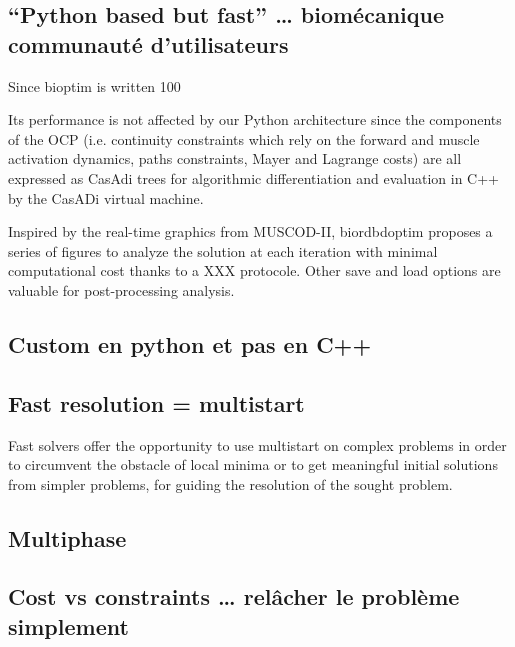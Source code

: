  

\subsection{“Python based but fast” … biomécanique communauté d’utilisateurs}

Since bioptim is written 100%

Its performance is not affected by our Python architecture since the components of the OCP (i.e. continuity constraints which rely on the forward and muscle activation dynamics, paths constraints, Mayer and Lagrange costs) are all expressed as CasAdi trees for algorithmic differentiation and evaluation in C++ by the CasADi virtual machine.  

Inspired by the  real-time graphics from MUSCOD-II, biordbdoptim proposes a series of figures to analyze the solution at each iteration with  minimal computational cost thanks to a XXX protocole. 
Other save and load options are valuable for post-processing analysis.

\subsection{Custom en python et pas en C++}

\subsection{Fast resolution = multistart}
Fast solvers offer the opportunity to use multistart on complex problems in order to circumvent the obstacle of local minima \cite{huchez2015local, bailly2020optimal} or to get meaningful initial solutions from simpler problems, for guiding the resolution of the sought problem.


\subsection{Multiphase}

\subsection{Cost vs constraints … relâcher le problème simplement}

